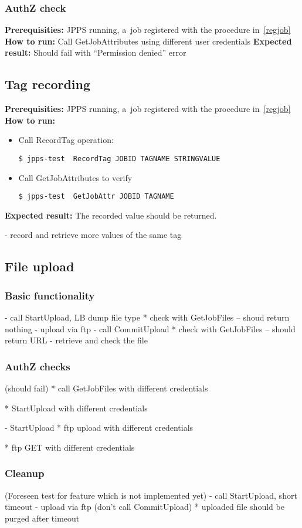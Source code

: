 \documentclass{egee}
\def\req{\noindent\textbf{Prerequisities: }}
\def\how{\noindent\textbf{How to run: }}
\def\result{\noindent\textbf{Expected result: }}
\begin{document}
\subsubsection{AuthZ check}
\req JPPS running, a~job registered with the procedure in~\ref{regjob}
\how
Call GetJobAttributes using different user credentials 
\result 
Should fail with ``Permission denied'' error

\subsection{Tag recording}
\req JPPS running, a~job registered with the procedure in~\ref{regjob}
\how 
\begin{itemize}
\item Call RecordTag operation:
\begin{verbatim}
$ jpps-test  RecordTag JOBID TAGNAME STRINGVALUE
\end{verbatim}
\item Call GetJobAttributes to verify
\begin{verbatim}
$ jpps-test  GetJobAttr JOBID TAGNAME
\end{verbatim}
\end{itemize}
\result
The recorded value should be returned.

- record and retrieve more values of the same tag
\subsection{File upload}

\subsubsection{Basic functionality}
- call StartUpload, LB dump file type
* check with GetJobFiles -- shoud return nothing
- upload via ftp
- call CommitUpload
* check with GetJobFiles -- should return URL
- retrieve and check the file

\subsubsection{AuthZ checks}
(should fail)
* call GetJobFiles with different credentials

* StartUpload with different credentials

- StartUpload
* ftp upload with different credentials

* ftp GET with different credentials

\subsubsection{Cleanup}
(Foreseen test for feature which is not implemented yet)
- call StartUpload, short timeout
- upload via ftp
(don't call CommitUpload)
* uploaded file should be purged after timeout
\end{document}
